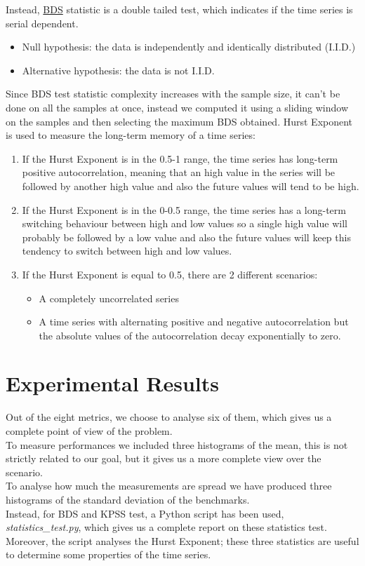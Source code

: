 Instead, \href{https://www.researchgate.net/publication/46554708_A_Fast_Algorithm_for_the_BDS_Statistic}{BDS} statistic is a double tailed test, which indicates if the time series is serial dependent.
\begin{itemize}
 	\item Null hypothesis: the data is independently and identically distributed (I.I.D.)
 	\item Alternative hypothesis: the data is not I.I.D.
\end{itemize}
Since BDS test statistic complexity increases with the sample size, it can't be done on all the samples at once, instead we computed it using a sliding window on the samples and then selecting the maximum BDS obtained.\newline
Hurst Exponent is used to measure the long-term memory of a time series:
\begin{enumerate}
	\item If the Hurst Exponent is in the 0.5-1 range, the time series has long-term positive autocorrelation, meaning that an high value in the series will be followed by another high value and also the future values will tend to be high.
	\item If the Hurst Exponent is in the 0-0.5 range, the time series has a long-term switching behaviour between high and low values so a single high value will probably be followed by a low value and also the future values will keep this tendency to switch between high and low values.
	\item If the Hurst Exponent is equal to 0.5, there are 2 different scenarios:
	\begin{itemize}
		\item A completely uncorrelated series
		\item A time series with alternating positive and negative autocorrelation but the absolute values of the autocorrelation decay exponentially to zero.
	\end{itemize}
\end{enumerate}

\clearpage

\section{Experimental Results}

Out of the eight metrics, we choose to analyse six of them, which gives us a complete point of view of the problem.\\
To measure performances we included three histograms of the mean, this is not strictly related to our goal, but it gives us a more complete view over the scenario.\\
To analyse how much the measurements are spread we have produced three histograms of the standard deviation of the benchmarks.\\
Instead, for BDS and KPSS test, a Python script has been used, \textit{statistics\_test.py}, which gives us a complete report on these statistics test. Moreover, the script analyses the Hurst Exponent; these three statistics are useful to determine some properties of the time series.
\clearpage
